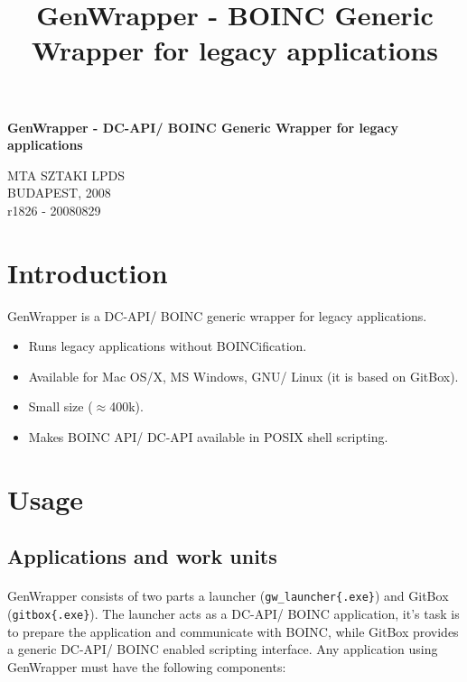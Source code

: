 \documentclass[a4paper,12pt,titlepage,dvipdfm]{article}
\title{GenWrapper - BOINC Generic Wrapper for legacy applications}
\begin{document}
\begin{center}
    \vspace*{20mm}
	\LARGE{\textbf{GenWrapper - DC-API/ BOINC Generic Wrapper for legacy applications}}
	\vfill
\end{center}
\begin{center}
    \vspace{30mm}
    \Large{MTA SZTAKI LPDS}\\
    \vspace{10mm}
    \large{BUDAPEST, 2008}\\
    \vspace{100mm}
    \small{r1826 - 20080829}
\end{center}
\thispagestyle{empty}

\pagebreak
\tableofcontents

\pagebreak
          

\section{Introduction}

GenWrapper is a DC-API/ BOINC generic wrapper for legacy applications.

\begin{itemize}
    \item Runs legacy applications without BOINCification.
    \item Available for Mac OS/X, MS Windows, GNU/ Linux (it is based on GitBox).
    \item Small size (\(\approx\)400k).
    \item Makes BOINC API/ DC-API available in POSIX shell scripting.
\end{itemize}

\section{Usage}

\subsection{Applications and work units}

\paragraph*{} GenWrapper consists of two parts a launcher (\texttt{gw\_launcher\{.exe\}}) and GitBox (\texttt{gitbox\{.exe\}}). The launcher acts as a DC-API/ BOINC application, it's task is to prepare the application and communicate with BOINC, while GitBox provides a generic DC-API/ BOINC enabled scripting interface. Any application using GenWrapper must have the following components:
\end{document}
